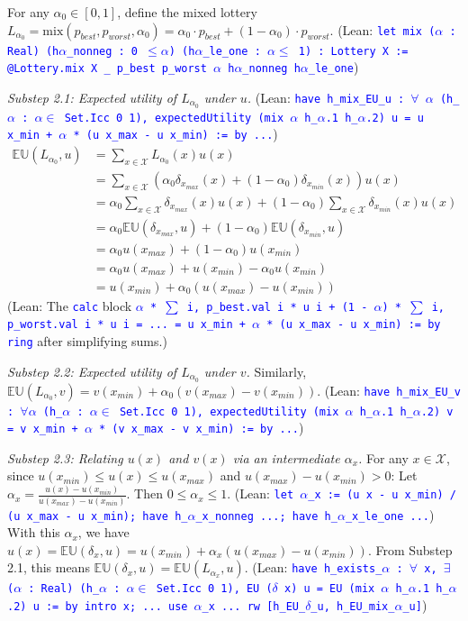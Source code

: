 \documentclass{article}
\theoremstyle{definition}
\newcommand{\X}{\mathcal{X}}
\newcommand{\EU}{\mathbb{EU}}
\newcommand{\tactic}[1]{\textcolor{blue}{\texttt{#1}}}
\newcommand{\mix}{\mathrm{mix}} %
\begin{document}
    For any $\alpha_0 \in [0, 1]$, define the mixed lottery $L_{\alpha_0} = \mix(p_{best}, p_{worst}, \alpha_0) = \alpha_0 \cdot p_{best} + (1-\alpha_0) \cdot p_{worst}$.
    (Lean: \tactic{let mix ($\alpha$ : Real) (h$\alpha$\_nonneg : 0 $\leq\alpha$) (h$\alpha$\_le\_one : $\alpha\leq$ 1) : Lottery X := @Lottery.mix X \_ p\_best p\_worst $\alpha$ h$\alpha$\_nonneg h$\alpha$\_le\_one})

    \textit{Substep 2.1: Expected utility of $L_{\alpha_0}$ under $u$.}
    (Lean: \tactic{have h\_mix\_EU\_u : $\forall$ $\alpha$ (h\_$\alpha$ : $\alpha\in$ Set.Icc 0 1), expectedUtility (mix $\alpha$ h\_$\alpha$.1 h\_$\alpha$.2) u = u x\_min + $\alpha$ * (u x\_max - u x\_min) := by ...})
    \begin{align*}
        \EU(L_{\alpha_0}, u) &= \sum_{x \in \X} L_{\alpha_0}(x)u(x) \\
        &= \sum_{x \in \X} (\alpha_0 \delta_{x_{max}}(x) + (1-\alpha_0)\delta_{x_{min}}(x)) u(x) \\
        &= \alpha_0 \sum_{x \in \X} \delta_{x_{max}}(x)u(x) + (1-\alpha_0) \sum_{x \in \X} \delta_{x_{min}}(x)u(x) \\
        &= \alpha_0 \EU(\delta_{x_{max}}, u) + (1-\alpha_0) \EU(\delta_{x_{min}}, u) \\
        &= \alpha_0 u(x_{max}) + (1-\alpha_0) u(x_{min}) \\
        &= \alpha_0 u(x_{max}) + u(x_{min}) - \alpha_0 u(x_{min}) \\
        &= u(x_{min}) + \alpha_0 (u(x_{max}) - u(x_{min}))
    \end{align*}
    (Lean: The \tactic{calc} block \tactic{$\alpha$ * $\sum$ i, p\_best.val i * u i + (1 - $\alpha$) * $\sum$ i, p\_worst.val i * u i = ... = u x\_min + $\alpha$ * (u x\_max - u x\_min) := by ring} after simplifying sums.)

    \textit{Substep 2.2: Expected utility of $L_{\alpha_0}$ under $v$.}
    Similarly, $\EU(L_{\alpha_0}, v) = v(x_{min}) + \alpha_0 (v(x_{max}) - v(x_{min}))$.
    (Lean: \tactic{have h\_mix\_EU\_v : $\forall\alpha$ (h\_$\alpha$ : $\alpha\in$ Set.Icc 0 1), expectedUtility (mix $\alpha$ h\_$\alpha$.1 h\_$\alpha$.2) v = v x\_min + $\alpha$ * (v x\_max - v x\_min) := by ...})

    \textit{Substep 2.3: Relating $u(x)$ and $v(x)$ via an intermediate $\alpha_x$.}
    For any $x \in \X$, since $u(x_{min}) \le u(x) \le u(x_{max})$ and $u(x_{max}) - u(x_{min}) > 0$:
    Let $\alpha_x = \frac{u(x) - u(x_{min})}{u(x_{max}) - u(x_{min})}$.
    Then $0 \le \alpha_x \le 1$.
    (Lean: \tactic{let $\alpha$\_x := (u x - u x\_min) / (u x\_max - u x\_min); have h\_$\alpha$\_x\_nonneg ...; have h\_$\alpha$\_x\_le\_one ...})
    With this $\alpha_x$, we have $u(x) = \EU(\delta_x, u) = u(x_{min}) + \alpha_x (u(x_{max}) - u(x_{min}))$.
    From Substep 2.1, this means $\EU(\delta_x, u) = \EU(L_{\alpha_x}, u)$.
    (Lean: \tactic{have h\_exists\_$\alpha$ : $\forall$ x, $\exists$ ($\alpha$ : Real) (h\_$\alpha$ : $\alpha\in$ Set.Icc 0 1), EU ($\delta$ x) u = EU (mix $\alpha$ h\_$\alpha$.1 h\_$\alpha$.2) u := by intro x; ... use $\alpha$\_x ... rw [h\_EU\_$\delta$\_u, h\_EU\_mix\_$\alpha$\_u]})
\end{document}

